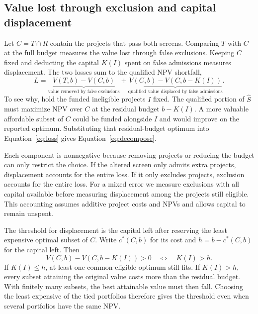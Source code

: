\documentclass[ijfs,article,submit,oneauthor]{Definitions/mdpi}
\begin{document}
\subsection{Value lost through exclusion and capital displacement}
Let $C=T\cap R$ contain the projects that pass both screens. Comparing $T$ with $C$ at the full budget measures the value lost through false exclusions. Keeping $C$ fixed and deducting the capital $K(I)$ spent on false admissions measures displacement. The two losses sum to the qualified NPV shortfall,
\begin{equation}
L=\underbrace{V(T,b)-V(C,b)}_{\text{value removed by false exclusions}}+
\underbrace{V(C,b)-V(C,b-K(I))}_{\text{qualified value displaced by false admissions}} .
\label{eq:decompose}
\end{equation}
To see why, hold the funded ineligible projects $I$ fixed. The qualified portion of $\widehat S$ must maximize NPV over $C$ at the residual budget $b-K(I)$. A more valuable affordable subset of $C$ could be funded alongside $I$ and would improve on the reported optimum. Substituting that residual-budget optimum into Equation~\eqref{eq:loss} gives Equation~\eqref{eq:decompose}.

Each component is nonnegative because removing projects or reducing the budget can only restrict the choice. If the altered screen only admits extra projects, displacement accounts for the entire loss. If it only excludes projects, exclusion accounts for the entire loss. For a mixed error we measure exclusions with all capital available before measuring displacement among the projects still eligible. This accounting assumes additive project costs and NPVs and allows capital to remain unspent.

The threshold for displacement is the capital left after reserving the least expensive optimal subset of $C$. Write $c^*(C,b)$ for its cost and $h=b-c^*(C,b)$ for the capital left. Then
\begin{equation}
 V(C,b)-V(C,b-K(I))>0 \quad\Longleftrightarrow\quad K(I)>h . \label{eq:slack}
\end{equation}
If $K(I)\leq h$, at least one common-eligible optimum still fits. If $K(I)>h$, every subset attaining the original value costs more than the residual budget. With finitely many subsets, the best attainable value must then fall. Choosing the least expensive of the tied portfolios therefore gives the threshold even when several portfolios have the same NPV.
\end{document}
